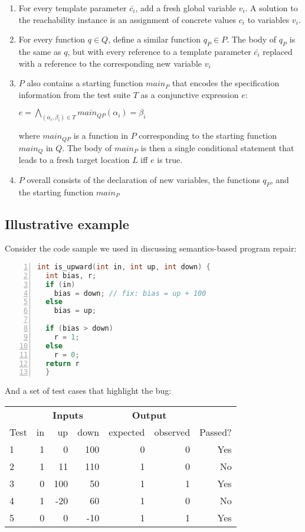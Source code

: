 \documentclass[11pt]{article}
\begin{document}
\begin{enumerate}
\item For every template parameter $\bar{c_i}$, add a fresh global variable $v_i$. A
  solution to the reachability instance is an assignment of concrete values
  $c_i$ to variables $v_i$.
\item For every function $q \in Q$, define a similar function $q_{P} \in P$.
  The body of $q_P$ is the same as $q$, but with every reference to a template
  parameter $\bar{c_i}$ replaced with a reference to the corresponding new variable $v_i$
\item $P$ also contains a starting function $main_P$ that encodes the
  specification information from the test suite $T$ as a conjunctive expression
  $e$:

$e = \bigwedge\limits_{(\alpha_i,\beta_i) \in T} main_{QP}(\alpha_i) = \beta_i$

where $main_{QP}$ is a function in $P$ corresponding to the starting function
$main_Q$ in $Q$.  The body of $main_P$ is then a single conditional statement that
leads to a fresh target location $L$ iff $e$ is true.  
\item $P$ overall consists of the declaration of new variables, the functions
  $q_P$, and the starting function $main_P$
\end{enumerate}

\subsection{Illustrative example}

Consider the code sample we used in discussing semantics-based program repair:

\begin{lstlisting}[language=C,basicstyle=\footnotesize,numbers=left]
int is_upward(int in, int up, int down) {
  int bias, r;
  if (in)
    bias = down; // fix: bias = up + 100
  else
    bias = up;
  
  if (bias > down)
    r = 1;
  else
    r = 0;
  return r
  }
\end{lstlisting}

And a set of test cases that highlight the bug:

\begin{tabular}{l|rrr|rr|r}
\toprule
   & \multicolumn{3}{c}{\textbf{Inputs}} & \multicolumn{2}{c}{\textbf{Output}} &  \\
Test & in   & up  & down & expected & observed & Passed? \\\midrule
1    & 1 & 0 & 100 & 0 & 0 & Yes \\
2    & 1 & 11 & 110 & 1 & 0 & No \\
3    & 0 & 100 & 50 & 1 & 1 & Yes \\
4    & 1 & -20 & 60 & 1 & 0 & No \\
5    & 0 & 0 & -10 & 1 & 1 & Yes \\
\bottomrule
\end{tabular}
\end{document}
